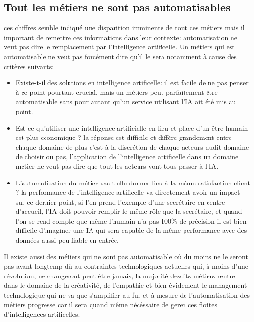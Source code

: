     \subsection*{Tout les métiers ne sont pas automatisables}
        ces chiffres semble indiqué une disparition imminente de tout ces métiers mais il important 
        de remettre ces informations dans leur contexte: automatisation ne veut pas dire le remplacement 
        par l'intelligence artificelle. Un métiers qui est automatisable ne veut pas forcément dire 
        qu'il le sera notamment à cause des critères suivants: \newline
        \begin{itemize}
            \item Existe-t-il des solutions en intelligence artificelle: il est facile de ne pas penser 
            à ce point pourtant crucial, mais un métiers peut parfaitement être automatisable sans 
            pour autant qu'un service utilisant l'IA ait été mis au point. 
            \newline

            \item Est-ce qu'utiliser une intelligence artificielle en lieu et place d'un être humain 
            est plus economique ? la réponse est difficile et diffère grandement entre chaque domaine 
            de plus c'est à la discrétion de chaque acteurs dudit domaine de choisir ou pas, 
            l'application de l'intelligence artificelle dans un domaine métier ne veut pas dire 
            que tout les acteurs vont tous passer à l'IA. 
            \newline

            \item L'automatisation du métier vas-t-elle donner lieu à la même satisfaction client ? 
            la performance de l'intelligence artificelle va directement avoir un impact sur ce dernier 
            point, si l'on prend l'exemple d'une secrétaire en centre d'accueil, l'IA 
            doit pouvoir remplir le même rôle que la secrétaire, et quand l'on se rend compte 
            que même l'humain n'a pas 100\% de précision il est bien difficile d'imaginer 
            une IA qui sera capable de la même performance avec des données aussi peu fiable 
            en entrée.
            \newline
        \end{itemize}

        Il existe aussi des métiers qui ne sont pas automatisable où du moins ne le seront pas avant 
        longtemp dù au contraintes technologiques actuelles qui, à moins d'une révolution, 
        ne changeront peut être jamais, la majorité desdits métiers rentre dans le domaine de la créativité,
        de l'empathie et bien évidement le management technologique qui ne va que s'amplifier 
        au fur et à mesure de l'automatisation des métiers progresse car il sera quand même nécéssaire 
        de gerer ces flottes d'intelligences artificelles.

